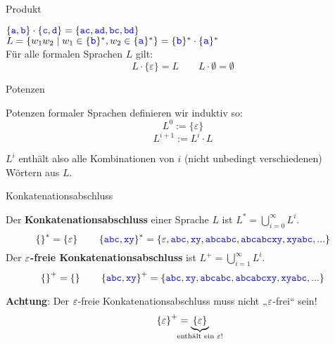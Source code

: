 \begin{frame}{Produkt}
	\begin{Beispiele}
		$\{\hbox{\textcolor{blue}{\texttt{a}}}, \hbox{\textcolor{blue}{\texttt{b}}}\} \cdot \{\hbox{\textcolor{blue}{\texttt{c}}}, \hbox{\textcolor{blue}{\texttt{d}}}\} = \{\hbox{\textcolor{blue}{\texttt{ac}}}, \hbox{\textcolor{blue}{\texttt{ad}}}, \hbox{\textcolor{blue}{\texttt{bc}}}, \hbox{\textcolor{blue}{\texttt{bd}}}\}$\\[0.3em]
		\pause
		$ L = \{w_1w_2 \mid w_1\in \{\literal{b}\}^* ,  w_2\in \{\literal{a}\}^* \} 
		= \{\literal{b}\}^* \cdot \{\literal{a}\}^* $\\[1em]
		\pause
		Für alle formalen Sprachen $L$ gilt:\\
		$$ L \cdot \{\varepsilon\} = L  \qquad L \cdot \emptyset = \emptyset$$
	\end{Beispiele}
\end{frame}



\begin{frame}{Potenzen}
	\begin{Definition}
	Potenzen formaler Sprachen definieren wir induktiv so: 
	$$L^0 := \{\varepsilon \}$$
	$$L^{i+1} := L^i \cdot L$$
	\end{Definition} \pause
	$L^i$ enthält also alle Kombinationen von $i$ (nicht unbedingt verschiedenen) Wörtern aus $L$.
\end{frame}

\begin{frame}{Konkatenationsabschluss}
	\begin{Definition}
		Der \textbf{Konkatenationsabschluss} einer Sprache $L$ ist \quad $L^\ast = \bigcup \limits_{i=0}^\infty L^i$. \\
		$$ \left\{\right\}^* = \left\{ \varepsilon \right\} \qquad \left\{\hbox{\textcolor{blue}{\texttt{abc}}}, \hbox{\textcolor{blue}{\texttt{xy}}}\right\}^* = \left\{\varepsilon, \hbox{\textcolor{blue}{\texttt{abc}}}, \hbox{\textcolor{blue}{\texttt{xy}}}, \hbox{\textcolor{blue}{\texttt{abcabc}}}, \hbox{\textcolor{blue}{\texttt{abcabcxy}}}, \hbox{\textcolor{blue}{\texttt{xyabc}}}, ...\right\} $$ 
		\medskip
		\pause
		Der \textbf{$\varepsilon$-freie Konkatenationsabschluss} ist \quad $L^+ = \bigcup \limits_{i=1}^\infty L^i$. \\
		$$ \left\{\right\}^+ = \left\{\right\} \qquad \left\{\hbox{\textcolor{blue}{\texttt{abc}}}, \hbox{\textcolor{blue}{\texttt{xy}}}\right\}^+ = \left\{\hbox{\textcolor{blue}{\texttt{abc}}}, \hbox{\textcolor{blue}{\texttt{xy}}}, \hbox{\textcolor{blue}{\texttt{abcabc}}}, \hbox{\textcolor{blue}{\texttt{abcabcxy}}}, \hbox{\textcolor{blue}{\texttt{xyabc}}}, ...\right\} $$
	\end{Definition} \pause
	\textbf{Achtung}: Der $\varepsilon$-freie Konkatenationsabschluss muss nicht „$\varepsilon$-frei“ sein! \\ \pause
	$$ \set{\eps}^+ = \underbrace{\set{\eps}}_{\mathclap{\text{enthält ein $\eps$!}}} $$
	
\end{frame}

